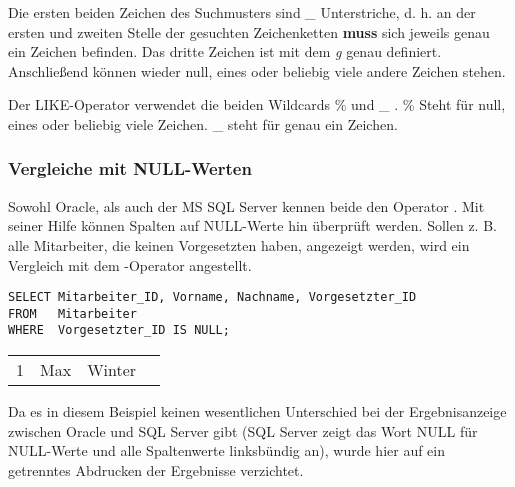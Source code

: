           Die ersten beiden Zeichen des Suchmusters sind \textit{\_} Unterstriche, d. h. an der ersten und zweiten Stelle der gesuchten Zeichenketten \textbf{muss} sich jeweils genau ein Zeichen befinden. Das dritte Zeichen ist mit dem \textit{g} genau definiert. Anschlie\ss end k\"onnen wieder null, eines oder beliebig viele andere Zeichen stehen.
          \begin{merke}
            Der LIKE-Operator verwendet die beiden Wildcards \% und \_ . \% Steht f\"ur null, eines oder beliebig viele Zeichen. \_ steht f\"ur genau ein Zeichen.
          \end{merke}
        \subsubsection{Vergleiche mit NULL-Werten}
          Sowohl Oracle, als auch der MS SQL Server kennen beide den Operator . Mit seiner Hilfe k\"onnen Spalten auf NULL-Werte hin \"uberpr\"uft werden. Sollen z. B. alle Mitarbeiter, die keinen Vorgesetzten haben, angezeigt werden, wird ein Vergleich mit dem -Operator angestellt.
          \begin{lstlisting}[language=oracle_sql,caption={Der IS NULL Operator},label=sql02_10]
SELECT Mitarbeiter_ID, Vorname, Nachname, Vorgesetzter_ID
FROM   Mitarbeiter
WHERE  Vorgesetzter_ID IS NULL;
          \end{lstlisting}
          \begin{center}
            \begin{small}
              \tablehead{}
              \begin{msoraclesql}
                \begin{supertabular}{rllr}
                1 & Max & Winter & \\
                \end{supertabular}
              \end{msoraclesql}
            \end{small}
          \end{center}
          Da es in diesem Beispiel keinen wesentlichen Unterschied bei der Ergebnisanzeige zwischen Oracle und SQL Server gibt (SQL Server zeigt das Wort NULL f\"ur NULL-Werte und alle Spaltenwerte linksb\"undig an), wurde hier auf ein getrenntes Abdrucken der Ergebnisse verzichtet.

